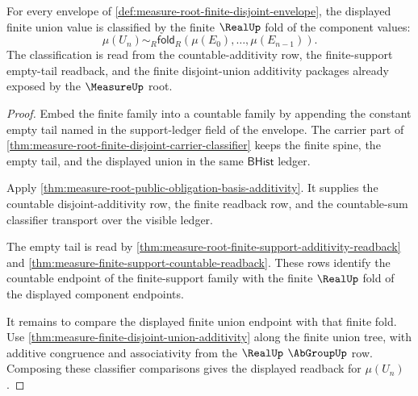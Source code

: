 \begin{theorem}
\label{thm:measure-root-finite-disjoint-additivity}
For every envelope of
\autoref{def:measure-root-finite-disjoint-envelope}, the displayed finite
union value is classified by the finite $\RealUp$ fold of the component
values:
$$
\mu(U_n)\sim_R\mathsf{fold}_R(\mu(E_0),\ldots,\mu(E_{n-1})).
$$
The classification is read from the countable-additivity row, the
finite-support empty-tail readback, and the finite disjoint-union additivity
packages already exposed by the $\MeasureUp$ root.
\end{theorem}
\begin{proof}
Embed the finite family into a countable family by appending the constant
empty tail named in the support-ledger field of the envelope. The carrier
part of \autoref{thm:measure-root-finite-disjoint-carrier-classifier} keeps
the finite spine, the empty tail, and the displayed union in the same
$\mathsf{BHist}$ ledger.

Apply \autoref{thm:measure-root-public-obligation-basis-additivity}. It
supplies the countable disjoint-additivity row, the finite readback row, and
the countable-sum classifier transport over the visible ledger.

The empty tail is read by
\autoref{thm:measure-root-finite-support-additivity-readback} and
\autoref{thm:measure-finite-support-countable-readback}. These rows identify
the countable endpoint of the finite-support family with the finite
$\RealUp$ fold of the displayed component endpoints.

It remains to compare the displayed finite union endpoint with that finite
fold. Use \autoref{thm:measure-finite-disjoint-union-additivity} along the
finite union tree, with additive congruence and associativity from the
$\RealUp$ $\AbGroupUp$ row. Composing these classifier comparisons gives the
displayed readback for $\mu(U_n)$.
\end{proof}


